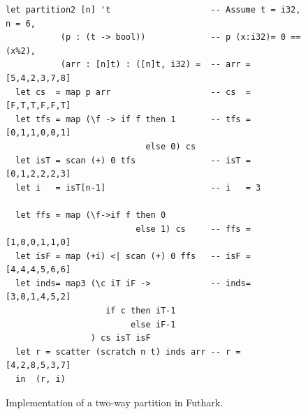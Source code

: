 \documentclass[acmsmall,review]{acmart}\settopmatter{printfolios=true,printccs=false,printacmref=false}
\begin{document}
\begin{figure}
\begin{lstlisting}[mathescape=true]
let partition2 [n] 't                    -- Assume t = i32, n = 6,
           (p : (t -> bool))             -- p (x:i32)= 0 == (x%2),
           (arr : [n]t) : ([n]t, i32) =  -- arr = [5,4,2,3,7,8]
  let cs  = map p arr                    -- cs  = [F,T,T,F,F,T]
  let tfs = map (\f -> if f then 1       -- tfs = [0,1,1,0,0,1]
                            else 0) cs
  let isT = scan (+) 0 tfs               -- isT = [0,1,2,2,2,3]
  let i   = isT[n-1]                     -- i   = 3

  let ffs = map (\f->if f then 0 
                          else 1) cs     -- ffs = [1,0,0,1,1,0]
  let isF = map (+i) <| scan (+) 0 ffs   -- isF = [4,4,4,5,6,6]
  let inds= map3 (\c iT iF ->            -- inds= [3,0,1,4,5,2]
                    if c then iT-1 
                         else iF-1
                 ) cs isT isF
  let r = scatter (scratch n t) inds arr -- r = [4,2,8,5,3,7]            
  in  (r, i) 
\end{lstlisting}\vspace{-4ex}
\caption{Implementation of a two-way partition in Futhark.}
\label{fig:futhark-partition2}
\end{figure}
\end{document}
